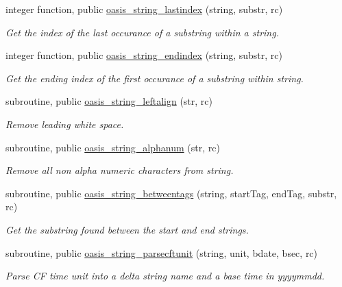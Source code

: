 \begin{DoxyCompactItemize}
integer function, public \hyperlink{classmod__oasis__string_afae0db32f2cf0b6beb00829f8f016e48}{oasis\+\_\+string\+\_\+lastindex} (string, substr, rc)
\begin{DoxyCompactList}\small\item\em Get the index of the last occurance of a substring within a string. \end{DoxyCompactList}\item 
integer function, public \hyperlink{classmod__oasis__string_a600ed4bd6221a0195d242076217377b4}{oasis\+\_\+string\+\_\+endindex} (string, substr, rc)
\begin{DoxyCompactList}\small\item\em Get the ending index of the first occurance of a substring within string. \end{DoxyCompactList}\item 
subroutine, public \hyperlink{classmod__oasis__string_a1d525e36684a0a574b74a2aace51324a}{oasis\+\_\+string\+\_\+leftalign} (str, rc)
\begin{DoxyCompactList}\small\item\em Remove leading white space. \end{DoxyCompactList}\item 
subroutine, public \hyperlink{classmod__oasis__string_af123aee419f09309d1ded79ae41243bd}{oasis\+\_\+string\+\_\+alphanum} (str, rc)
\begin{DoxyCompactList}\small\item\em Remove all non alpha numeric characters from string. \end{DoxyCompactList}\item 
subroutine, public \hyperlink{classmod__oasis__string_a465ffaf8d7c5462f3de8595934d58c8d}{oasis\+\_\+string\+\_\+betweentags} (string, start\+Tag, end\+Tag, substr, rc)
\begin{DoxyCompactList}\small\item\em Get the substring found between the start and end strings. \end{DoxyCompactList}\item 
subroutine, public \hyperlink{classmod__oasis__string_a2f7bae9ccc5d2c48c14f3a1525a6c234}{oasis\+\_\+string\+\_\+parsecftunit} (string, unit, bdate, bsec, rc)
\begin{DoxyCompactList}\small\item\em Parse C\+F time unit into a delta string name and a base time in yyyymmdd. \end{DoxyCompactList}\item 

\end{DoxyCompactItemize}
